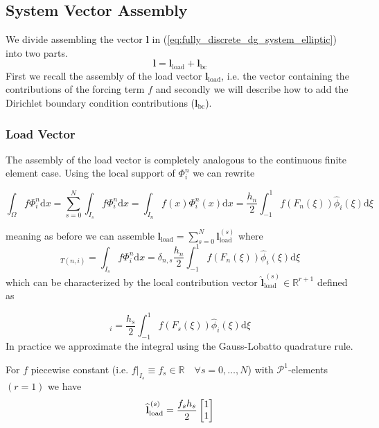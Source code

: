 \subsection{System Vector Assembly}
We divide assembling the vector \textbf{l} in (\ref{eq:fully_discrete_dg_system_elliptic}) into two parts.
\begin{equation*}
	\textbf{l} = \textbf{l}_{\text{load}} + \textbf{l}_{\text{bc}}
\end{equation*}
First we recall the assembly of the load vector $\textbf{l}_{\text{load}}$, i.e. the vector containing the contributions of the forcing term $f$
and secondly we will describe how to add the Dirichlet boundary condition contributions ($\textbf{l}_{\text{bc}}$).
\subsubsection{Load Vector}
The assembly of the load vector is completely analogous to the continuous finite element case.
Using the local support of $\Phi_i^n$ we can rewrite

\begin{equation*}
	\int_{\Omega} f \Phi_i^n \text{d}x = \sum_{s=0}^{N} \int_{I_s} f \Phi_i^n \text{d} x = \int_{I_n} f(x) \Phi_i^n(x) \text{d} x
	= \frac{h_n}{2} \int_{-1}^{1} f(F_n(\xi))\widehat{\phi}_i(\xi)\text{d}\xi
\end{equation*}

meaning as before we can assemble $\textbf{l}_{\text{load}} = \sum_{s=0}^{N} \textbf{l}_{\text{load}}^{(s)}$ where
\begin{equation*}
    [\textbf{l}_{\text{load}}^{(s)}]_{T(n,i)} = \int_{I_s} f \Phi_i^n \text{d} x = \delta_{n,s} \frac{h_n}{2} \int_{-1}^{1} f(F_n(\xi))\widehat{\phi}_i(\xi)\text{d}\xi
\end{equation*}
which can be characterized by the local contribution vector $\widehat{\textbf{l}}_{\text{load}}^{\,(s)} \in \mathbb{R}^{r+1}$ defined as

\begin{equation*}
	[\widehat{\textbf{l}}_{\text{load}}^{\,(s)}]_{i}
	= \frac{h_s}{2} \int_{-1}^{1} f(F_s(\xi))\widehat{\phi}_i(\xi)\text{d}\xi
\end{equation*}
In practice we approximate the integral using the Gauss-Lobatto quadrature rule.

\begin{example}
	For $f$ piecewise constant (i.e. $f|_{I_s} \equiv f_s \in \mathbb{R} \quad \forall s=0,\ldots,N$) with $\mathcal{P}^1$-elements $(r=1)$ we have
	\begin{equation*}
		\normalfont \widehat{\textbf{l}}_{\text{load}}^{\,(s)} = \frac{f_s h_s}{2}
		\begin{bmatrix}
			1 \\
			1
		\end{bmatrix}
	\end{equation*}
\end{example}

